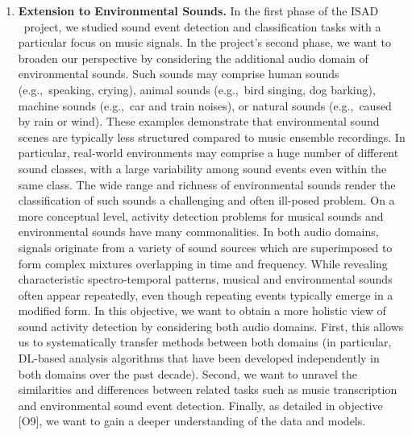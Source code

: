 \documentclass[11pt,a4paper]{article}
\def\PN{\mathrm{ISAD}}
\newcommand{\egc}{e.g.,\ }
\theoremstyle{plain} \newtheorem{define}{Definition}[section]
\begin{document}
{\begin{enumerate}
\item \label{objective:renew_audio}
\textbf{Extension to Environmental Sounds.}
%
In the first phase of the $\PN$~project, we studied sound event detection and classification tasks with a particular focus on music signals. In the project's second phase, we want to broaden our perspective by considering the additional audio domain of environmental sounds. Such sounds may comprise human sounds (\egc speaking, crying), animal sounds (\egc bird singing, dog barking), machine sounds (\egc car and train noises), or natural sounds (\egc caused by rain or wind). These examples demonstrate that environmental sound scenes are typically less structured compared to music ensemble recordings. In particular, real-world environments may comprise a huge number of different sound classes, with a large variability among sound events even within the same class. The wide range and richness of environmental sounds render the classification of such sounds a challenging and often ill-posed problem.
%
On a more conceptual level, activity detection problems for musical sounds and environmental sounds have many commonalities. In both audio domains, signals originate from a variety of sound sources which are superimposed to form complex mixtures overlapping in time and frequency. While revealing characteristic spectro-temporal patterns, musical and environmental sounds often appear repeatedly, even though repeating events typically emerge in a modified form.
%
In this objective, we want to obtain a more holistic view of sound activity detection by considering both audio domains. First, this allows us to systematically transfer methods between both domains (in particular, DL-based analysis algorithms that have been developed independently in both domains over the past decade). Second, we want to unravel the similarities and differences between related tasks such as music transcription and environmental sound event detection. Finally, as detailed in objective [O9], we want to gain a deeper understanding of the data and models.


\end{enumerate}}
\end{document}
